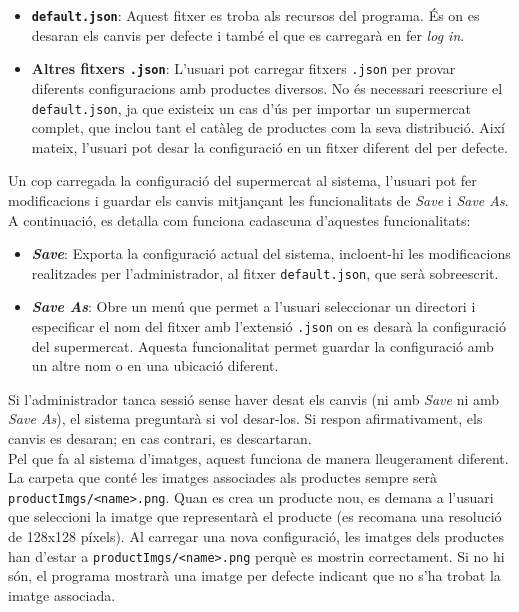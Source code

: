 \documentclass[a4paper,12pt]{article}
\begin{document}
	\begin{itemize}
		\item \textbf{\texttt{default.json}}: Aquest fitxer es troba als recursos del programa. És on es desaran els canvis per defecte i també el que es carregarà en fer \textit{log in}.
		\item \textbf{Altres fitxers \texttt{.json}}: L'usuari pot carregar fitxers \texttt{.json} per provar diferents configuracions amb productes diversos. No és necessari reescriure el \texttt{default.json}, ja que existeix un cas d'ús per importar un supermercat complet, que inclou tant el catàleg de productes com la seva distribució. Així mateix, l'usuari pot desar la configuració en un fitxer diferent del per defecte.
	\end{itemize}
	
	Un cop carregada la configuració del supermercat al sistema, l'usuari pot fer modificacions i guardar els canvis mitjançant les funcionalitats de \textit{Save} i \textit{Save As}. A continuació, es detalla com funciona cadascuna d'aquestes funcionalitats:
	
	\begin{itemize}
		\item \textbf{\textit{Save}}: Exporta la configuració actual del sistema, incloent-hi les modificacions realitzades per l'administrador, al fitxer \texttt{default.json}, que serà sobreescrit.
		\item \textbf{\textit{Save As}}: Obre un menú que permet a l'usuari seleccionar un directori i especificar el nom del fitxer amb l'extensió \texttt{.json} on es desarà la configuració del supermercat. Aquesta funcionalitat permet guardar la configuració amb un altre nom o en una ubicació diferent.
	\end{itemize}
	
	Si l'administrador tanca sessió sense haver desat els canvis (ni amb \textit{Save} ni amb \textit{Save As}), el sistema preguntarà si vol desar-los. Si respon afirmativament, els canvis es desaran; en cas contrari, es descartaran. \\
	
	Pel que fa al sistema d’imatges, aquest funciona de manera lleugerament diferent. La carpeta que conté les imatges associades als productes sempre serà \texttt{productImgs/<name>.png}. Quan es crea un producte nou, es demana a l'usuari que seleccioni la imatge que representarà el producte (es recomana una resolució de 128x128 píxels). Al carregar una nova configuració, les imatges dels productes han d’estar a \texttt{productImgs/<name>.png} perquè es mostrin correctament. Si no hi són, el programa mostrarà una imatge per defecte indicant que no s’ha trobat la imatge associada.
\end{document}
